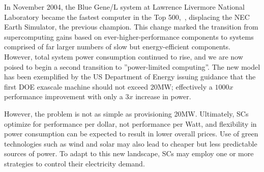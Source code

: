 In November 2004, the Blue Gene/L system at Lawrence Livermore National Laboratory
became the fastest computer in the Top 500,~\cite{FIXME}, displacing the NEC Earth Simulator,
the previous champion.  This change marked the transition from supercomputing gains based
on ever-higher-performance components to systems comprised of far larger numbers of 
slow but energy-efficient components.  However, total system power consumption continued to rise,
and we are now poised to begin a second transition to ''power-limited computing''.  The new
model has been exemplified by the US Department of Energy issuing guidance that the first
DOE exascale machine should not exceed 20MW; effectively a $1000x$ performance improvement
with only a $3x$ increase in power.  

However, the problem is not as simple as provisioning 20MW.  Ultimately, SCs optimize for
performance per dollar, not performance per Watt, and flexibility in power consumption
can be expected to result in lower overall prices.  Use of green technologies such as
wind and solar may also lead to cheaper but less predictable sources of power.
To adapt to this new landscape, SCs may employ one or more strategies to control their 
electricity demand.

